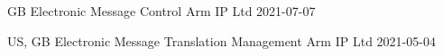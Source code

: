 \begin{cvawards}

\cvaward
  {GB} %
  {Electronic Message Control}
  {Arm IP Ltd}
  {2021-07-07}

\cvaward
  {US, GB}
  {Electronic Message Translation Management}
  {Arm IP Ltd}
  {2021-05-04}


\end{cvawards}
